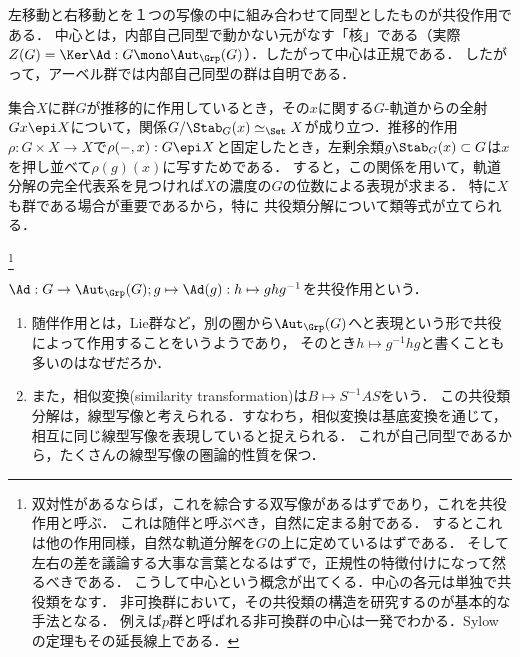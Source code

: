 \documentclass[uplatex,dvipdfmx]{jsreport}
\begin{document}
\begin{tcolorbox}[colframe=ForestGreen, colback=ForestGreen!10!white,breakable,colbacktitle=ForestGreen!40!white,coltitle=black,fonttitle=\bfseries\sffamily,
title=共役作用の定める軌道分解を共役類分解といい，推移的作用が定める集合の同型を類等式という]
    左移動と右移動とを１つの写像の中に組み合わせて同型としたものが共役作用である．
    中心とは，内部自己同型で動かない元がなす「核」である（実際$Z(G)=\Ker\Ad:G\mono\Aut_\Grp(G)$）．したがって中心は正規である．
    したがって，アーベル群では内部自己同型の群は自明である．

    集合$X$に群$G$が推移的に作用しているとき，その$x$に関する$G$-軌道からの全射$Gx\epi X$について，関係$G/\Stab_G(x)\simeq_\Set X$が成り立つ．推移的作用$\rho:G\times X\to X$で$\rho(-,x):G\epi X$と固定したとき，左剰余類$g\Stab_G(x)\subset G$は$x$を押し並べて$\rho(g)(x)$に写すためである．
    すると，この関係を用いて，軌道分解の完全代表系を見つければ$X$の濃度の$G$の位数による表現が求まる．
    特に$X$も群である場合が重要であるから，特に
    共役類分解について類等式が立てられる．
\end{tcolorbox}
\footnote{双対性があるならば，これを綜合する双写像があるはずであり，これを共役作用と呼ぶ．
これは随伴と呼ぶべき，自然に定まる射である．
するとこれは他の作用同様，自然な軌道分解を$G$の上に定めているはずである．
そして左右の差を議論する大事な言葉となるはずで，正規性の特徴付けになって然るべきである．
こうして中心という概念が出てくる．中心の各元は単独で共役類をなす．
非可換群において，その共役類の構造を研究するのが基本的な手法となる．
例えば$p$群と呼ばれる非可換群の中心は一発でわかる．Sylowの定理もその延長線上である．}

\begin{definition}
    $\Ad:G\to\Aut_\Grp(G);g\mapsto\Ad(g):h\mapsto ghg^{-1}$を共役作用という．
\end{definition}
\begin{remark}\mbox{}
    \begin{enumerate}
        \item 随伴作用とは，Lie群など，別の圏から$\Aut_\Grp(G)$へと表現という形で共役によって作用することをいうようであり，
        そのとき$h\mapsto g^{-1}hg$と書くことも多いのはなぜだろか．
        \item また，相似変換(similarity transformation)は$B\mapsto S^{-1}AS$をいう．
        この共役類分解は，線型写像と考えられる．すなわち，相似変換は基底変換を通じて，相互に同じ線型写像を表現していると捉えられる．
        これが自己同型であるから，たくさんの線型写像の圏論的性質を保つ．
    \end{enumerate}
\end{remark}
\end{document}
